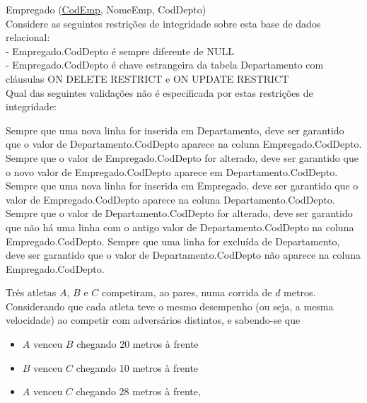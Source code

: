 \documentclass[12pt, addpoints]{exam}
\begin{document}
\begin{questions}
Empregado (\underline{CodEmp}, NomeEmp, CodDepto)\\

Considere as seguintes restrições de integridade sobre esta base de dados relacional:\\

- Empregado.CodDepto é sempre diferente de NULL\\

- Empregado.CodDepto é chave estrangeira da tabela Departamento com cláusulas ON DELETE RESTRICT e ON UPDATE RESTRICT\\

Qual das seguintes validações não é especificada por estas restrições de integridade:
\begin{choices}
\choice Sempre que uma nova linha for inserida em Departamento, deve ser garantido que o valor de Departamento.CodDepto aparece na coluna Empregado.CodDepto.
\choice Sempre que o valor de Empregado.CodDepto for alterado, deve ser garantido que o novo valor de Empregado.CodDepto aparece em Departamento.CodDepto.
\choice Sempre que uma nova linha for inserida em Empregado, deve ser garantido que o valor de Empregado.CodDepto aparece na coluna Departamento.CodDepto.
\choice Sempre que o valor de Departamento.CodDepto for alterado, deve ser garantido que não há uma linha com o antigo valor de Departamento.CodDepto na coluna Empregado.CodDepto.
\choice Sempre que uma linha for excluída de Departamento, deve ser garantido que o valor de Departamento.CodDepto não aparece na coluna Empregado.CodDepto.
\end{choices}

\question

Três atletas \( A \), \( B \) e \( C \) competiram, ao pares, numa corrida de \( d \) metros. Considerando que cada atleta teve o mesmo desempenho (ou seja, a mesma velocidade) ao competir com adversários distintos, e sabendo-se que



\begin{itemize}

    \item \( A \) venceu \( B \) chegando 20 metros à frente

    \item \( B \) venceu \( C \) chegando 10 metros à frente

    \item \( A \) venceu \( C \) chegando 28 metros à frente,

\end{itemize}




\end{questions}
\end{document}
